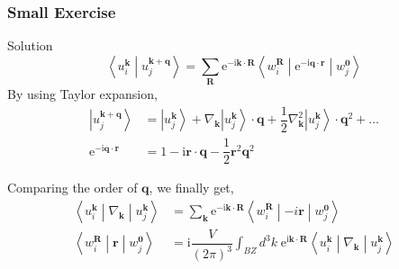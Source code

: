 \documentclass{beamer}
\begin{document}
  \begin{frame}
    \frametitle{Small Exercise}

    \begin{block}{Solution}
      \small 
      \begin{equation*}
        \left\langle{}u_i^{\mathbf{k}}\middle|{}u_j^{\mathbf{k}+\mathbf{q}}\right\rangle = \sum_{\mathbf{R}}\mathrm{e}^{-\mathrm{i}\mathbf{k}\cdot\mathbf{R}}\left\langle{}w_i^{\mathbf{R}}\middle|\mathrm{e}^{-\mathrm{i}\mathbf{q}\cdot\mathbf{r}}\middle|{}w_j^{\mathbf{0}}\right\rangle
      \end{equation*}
      By using Taylor expansion,
      \begin{equation*}
        \begin{aligned}
          \left|u_j^{\mathbf{k}+\mathbf{q}}\right\rangle &= \left|u_j^{\mathbf{k}}\right\rangle + \nabla_\mathbf{k}\left|u_j^{\mathbf{k}}\right\rangle\cdot\mathbf{q} + \dfrac{1}{2}\nabla^2_\mathbf{k}\left|u_j^{\mathbf{k}}\right\rangle\cdot\mathbf{q}^2 + \ldots\\
          \mathrm{e}^{-\mathrm{i}\mathbf{q}\cdot\mathbf{r}} &= 1 - \mathrm{i}\mathbf{r}\cdot\mathbf{q} - \dfrac{1}{2}\mathbf{r}^2\mathbf{q}^2
        \end{aligned}
      \end{equation*}

      Comparing the order of \(\mathbf{q}\), we finally get, 
      \begin{subequations}
        \begin{align}
          \left\langle{}u_i^{\mathbf{k}}\middle|\nabla_\mathbf{k}\middle|u_j^{\mathbf{k}}\right\rangle &= \sum_{\mathbf{k}}\mathrm{e}^{-\mathrm{i}\mathbf{k}\cdot\mathbf{R}}\left\langle{}w_i^{\mathbf{R}}\middle|-i\mathbf{r}\middle|{}w_j^{\mathbf{0}}\right\rangle\\
          \left\langle{}w_i^{\mathbf{R}}\middle|\mathbf{r}\middle|{}w_j^{\mathbf{0}}\right\rangle &= \mathrm{i}\dfrac{V}{(2\pi)^3}\int_{BZ}d^3k\; \mathrm{e}^{\mathrm{i}\mathbf{k}\cdot\mathbf{R}}\left\langle{}u_i^{\mathbf{k}}\middle|\nabla_\mathbf{k}\middle|u_j^{\mathbf{k}}\right\rangle
        \end{align}
      \end{subequations}

    \end{block}

    \end{frame}
\end{document}
